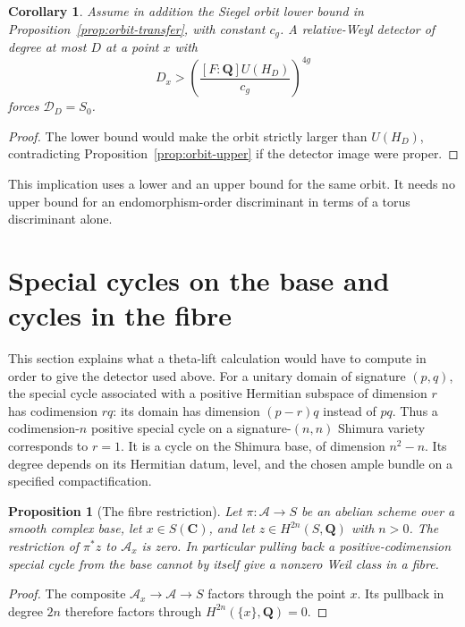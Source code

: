 \documentclass[11pt]{article}
\newtheorem{proposition}[theorem]{Proposition}
\newtheorem{corollary}[theorem]{Corollary}
\theoremstyle{definition}
\theoremstyle{remark}
\newcommand{\Q}{\mathbf Q}
\begin{document}
\begin{corollary}\label{cor:centre-forcing}
Assume in addition the Siegel orbit lower bound in
Proposition~\ref{prop:orbit-transfer}, with constant $c_g$.
A relative-Weyl detector of degree at most $D$ at a point $x$
with
\[
 D_x>\left(\frac{[F:\Q]U(H_D)}{c_g}\right)^{4g}
\]
forces $\mathcal D_D=S_0$.
\end{corollary}
\begin{proof}
The lower bound would make the orbit strictly larger than
$U(H_D)$, contradicting Proposition~\ref{prop:orbit-upper}
if the detector image were proper.
\end{proof}

This implication uses a lower and an upper bound for the same
orbit.  It needs no upper bound for an endomorphism-order
discriminant in terms of a torus discriminant alone.


\section{Special cycles on the base and cycles in the fibre}
\label{sec:theta-scope}

This section explains what a theta-lift calculation would have to
compute in order to give the detector used above.
For a unitary domain of signature $(p,q)$, the special cycle
associated with a positive Hermitian subspace of dimension $r$
has codimension $rq$: its domain has dimension $(p-r)q$
instead of $pq$.  Thus a codimension-$n$ positive special cycle
on a signature-$(n,n)$ Shimura variety corresponds to $r=1$.
It is a cycle on the Shimura base, of dimension $n^2-n$.
Its degree depends on its Hermitian datum, level, and the chosen
ample bundle on a specified compactification.

\begin{proposition}[The fibre restriction]
\label{prop:base-cycle-restriction}
Let $\pi:\mathcal A\to S$ be an abelian scheme over a smooth
complex base, let $x\in S(\mathbf C)$, and let
$z\in H^{2n}(S,\mathbf Q)$ with $n>0$.  The restriction of
$\pi^*z$ to $\mathcal A_x$ is zero.  In particular pulling back
a positive-codimension special cycle from the base cannot by
itself give a nonzero Weil class in a fibre.
\end{proposition}

\begin{proof}
The composite $\mathcal A_x\to\mathcal A\to S$ factors through
the point $x$.  Its pullback in degree $2n$ therefore factors
through $H^{2n}(\{x\},\mathbf Q)=0$.
\end{proof}
\end{document}
